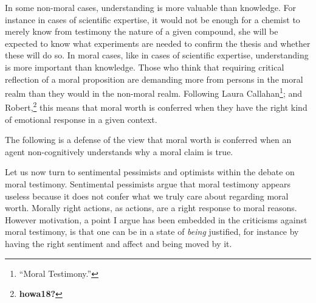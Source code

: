 \documentclass[phdthesis,12pt,final]{wuthesis}
\theoremstyle{definition}
\theoremstyle{definition}
\theoremstyle{definition}
\theoremstyle{definition}
\theoremstyle{remark}
\begin{document}
In some non-moral cases, understanding is more valuable than knowledge. For instance in cases of scientific expertise, it would not be enough for a chemist to merely know from testimony the nature of a given compound, she will be expected to know what experiments are needed to confirm the thesis and whether these will do so. In moral cases, like in cases of scientific expertise, understanding is more important than knowledge. Those who think that requiring critical reflection of a moral proposition are demanding more from persons in the moral realm than they would in the non-moral realm. Following Laura Callahan\footnote{{``Moral {Testimony}.''}}; and Robert,\footnote{\textbf{howa18?}} this means that moral worth is conferred when they have the right kind of emotional response in a given context.

The following is a defense of the view that moral worth is conferred when an agent non-cognitively understands why a moral claim is true.

\begin{Shaded}
\begin{Highlighting}[]

\end{Highlighting}
\end{Shaded}

\begin{Shaded}
\begin{Highlighting}[]

\end{Highlighting}
\end{Shaded}

\begin{Shaded}
\begin{Highlighting}[]

\end{Highlighting}
\end{Shaded}

Let us now turn to sentimental pessimists and optimists within the debate on moral testimony. Sentimental pessimists argue that moral testimony appears useless because it does not confer what we truly care about regarding moral worth. Morally right actions, as actions, are a right response to moral reasons. However motivation, a point I argue has been embedded in the criticisms against moral testimony, is that one can be in a state of \emph{being} justified, for instance by having the right sentiment and affect and being moved by it.
\end{document}
